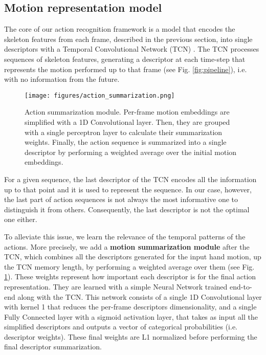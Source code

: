 \documentclass[letterpaper, 10 pt, conference]{ieeeconf}
\begin{document}
\subsection{Motion representation model}\label{sec:tcn}



The core of our action recognition framework is a model that encodes the skeleton features from each frame, described in the previous section, into single descriptors with a Temporal Convolutional Network (TCN) \cite{bai2018empirical, oord2016wavenet}. 
The TCN processes sequences of skeleton features, generating a descriptor at each time-step that represents the motion performed up to that frame (see Fig. \ref{fig:pipeline}), i.e. with no information from the future.






\begin{figure}
    \centering
    \texttt{[image: figures/action\_summarization.png]}
    \caption{Action summarization module. Per-frame motion embeddings are simplified with a 1D Convolutional layer. Then, they are grouped with a single perceptron layer to calculate their summarization weights. Finally, the action sequence is summarized into a single descriptor by performing a weighted average over the initial motion embeddings.}
    \label{fig:summarization}
\end{figure}



For a given sequence, the last descriptor of the TCN encodes all the information up to that point and it is used to represent the sequence. 
In our case, however, the last part of action sequences is not always the most informative one to distinguish it from others. Consequently, the last descriptor is not the optimal one either. 


To alleviate this issue, we learn the relevance of the temporal patterns of the actions. More precisely, we add a \textbf{motion summarization module} after the TCN, which combines all the descriptors generated for 
the input hand motion, 
up the TCN memory length, by performing a weighted average over them (see Fig. \ref{fig:summarization}). 
These weights represent how important each descriptor is for the final action representation. They are learned with a simple Neural Network trained end-to-end along with the TCN. 
This network consists of a single 1D Convolutional layer with kernel 1 that reduces the per-frame descriptors dimensionality, and a single Fully Connected layer with a sigmoid activation layer, that takes as input all the simplified descriptors and outputs a vector of categorical probabilities (i.e. descriptor weights). These final weights are L1 normalized before performing the final descriptor summarization. 
\end{document}
